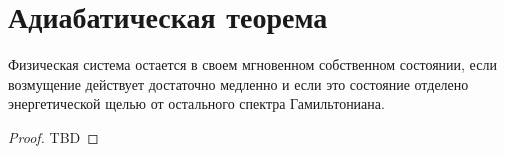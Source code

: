 \section{Адиабатическая теорема}

\begin{theorem}
\label{addQAdiabatic}
Физическая система остается в своем мгновенном собственном состоянии,
если возмущение действует достаточно медленно и если это состояние
отделено энергетической щелью от остального спектра Гамильтониана.
\end{theorem}

\begin{proof}
  TBD
\end{proof}
